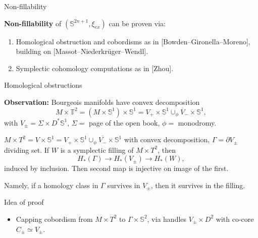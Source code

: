 \documentclass{beamer}
\begin{document}
\begin{frame}{Non-fillability}

\textbf{Non-fillability} of $(\mathbb S^{2n+1},\xi_{ex})$ can be proven via:

\begin{enumerate}
    \item Homological obstruction and cobordisms as in [Bowden--Gironella--Moreno], building on [Massot--Niederkr\"uger--Wendl].
    \item Symplectic cohomology computations as in [Zhou].
\end{enumerate}

\end{frame}

\begin{frame}{Homological obstructions}

\textbf{Observation:} Bourgeois manifolds have convex decomposition $$M\times \mathbb T^2=(M\times \mathbb S^1)\times \mathbb S^1= V_+\times \mathbb S^1 \cup_\phi \overline{V}_-\times \mathbb S^1,$$ with $V_\pm=\Sigma \times D^*\mathbb S^1$, $\Sigma=$ page of the open book, $\phi=$ monodromy.

\pause

\begin{theorem}

$M \times T^2 =V\times \mathbb S^1=V_+\times \mathbb S^1\cup_\phi \overline{V_-}\times \mathbb S^1$ with convex decomposition, 
$\Gamma=\partial V_\pm$ dividing set. 
If $W$ is a symplectic filling of $M \times T^2$, then
$$
H_*(\Gamma)\rightarrow H_*(V_\pm) \rightarrow H_*(W),
$$
induced by inclusion. Then second map is injective on image of the first.
\end{theorem}

Namely, if a homology class in $\Gamma$ survives in $V_\pm$, then it survives in the filling.
    
\end{frame}

\begin{frame}{Idea of proof}
\begin{itemize}
\item Capping cobordism from $M\times T^2$ to $\Gamma\times \mathbb S^2$, via handles $V_\pm \times D^2$ with co-core $C_\pm \simeq V_\pm$. 
\end{itemize}
\end{frame}
\end{document}
